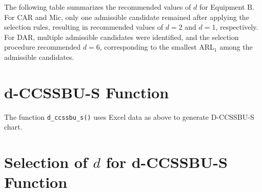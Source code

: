 \documentclass[
  12pt,
  letterpaper,
  DIV=11,
  numbers=noendperiod]{scrartcl}
\begin{document}
\FloatBarrier

The following table summarizes the recommended values of \(d\) for
Equipment B. For CAR and Mic, only one admissible candidate remained
after applying the selection rules, resulting in recommended values of
\(d=2\) and \(d=1\), respectively. For DAR, multiple admissible
candidates were identified, and the selection procedure recommended
\(d=6\), corresponding to the smallest ARL\(_1\) among the admissible
candidates.

\begin{table}[H]
\centering
\caption{\label{tab:display-d-selection-recommendation-l-equipment-b-v7}Recommended d values for the d-CCSSBU-L chart for Equipment B.}
\centering
{}
\end{table}

\FloatBarrier

\section{d-CCSSBU-S Function}\label{d-ccssbu-s-function}

The function \texttt{d\_ccssbu\_s()} uses Excel data as above to
generate D-CCSSBU-S chart.

\section{\texorpdfstring{Selection of \(d\) for d-CCSSBU-S
Function}{Selection of d for d-CCSSBU-S Function}}\label{selection-of-d-for-d-ccssbu-s-function}
\end{document}
